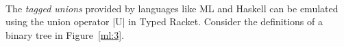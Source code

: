 
~~\\

The \emph{tagged unions} provided by languages like ML and Haskell can be
emulated using the union operator \scheme|U| in Typed Racket. Consider
the definitions of a binary tree in Figure~\ref{ml:3}.
~~\\
% 
% 
% 
% 
% 
%   
% 

